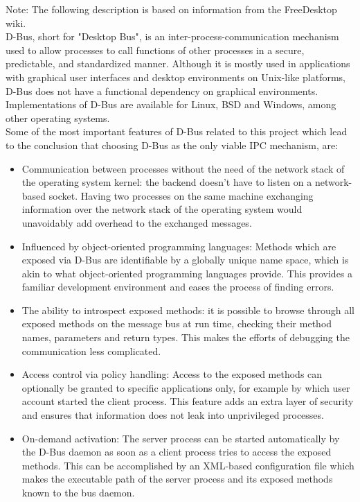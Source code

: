 Note: The following description is based on information from the FreeDesktop wiki.\cite{dbus1}
\\
D-Bus, short for "Desktop Bus", is an inter-process-communication mechanism used to allow 
processes to call functions of other processes in a secure, predictable, and 
standardized manner. Although it is mostly used in applications with graphical user interfaces 
and desktop environments on Unix-like platforms, D-Bus does not have a functional dependency 
on graphical environments. Implementations of D-Bus are available for Linux, BSD and Windows, 
among other operating systems.
\\
Some of the most important features of D-Bus related to this project which lead to the conclusion that choosing D-Bus as the only viable IPC mechanism, are:
\begin{itemize}
\item {Communication between processes without the need of the network stack of the operating system kernel: the backend doesn't have to listen on a network-based socket. Having two processes on the same machine exchanging information over the network stack of the operating system would unavoidably add overhead to the exchanged messages.}
\item {Influenced by object-oriented programming languages: Methods which are exposed via D-Bus are identifiable by a globally unique name space, which is akin to what object-oriented programming languages provide. This provides a familiar development environment and eases the process of finding errors.}
\item {The ability to introspect exposed methods: it is possible to browse through all exposed methods on the message bus at run time, checking their method names, parameters and return types. This makes the efforts of debugging the communication less complicated.}
\item {Access control via policy handling: Access to the exposed methods can optionally be granted to specific applications only, for example by which user account started the client process. This feature adds an extra layer of security and ensures that information does not leak into unprivileged processes.}
\item {On-demand activation: The server process can be started automatically by the D-Bus daemon as soon as a client process tries to access the exposed methods. This can be accomplished by an XML-based configuration file which makes the executable path of the server process and its exposed methods known to the bus daemon.}
\end{itemize}

